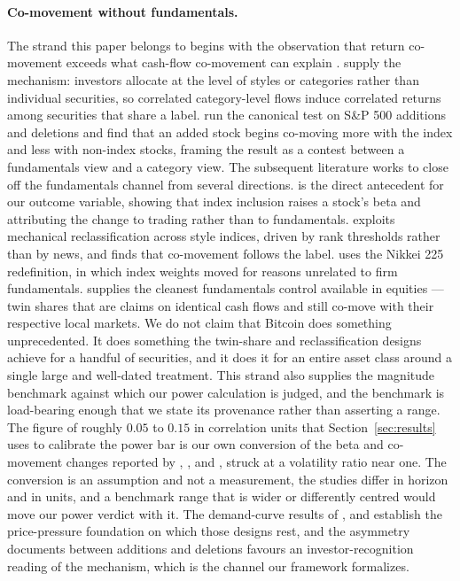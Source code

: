 \documentclass[12pt,a4paper]{article}
\begin{document}
\paragraph{Co-movement without fundamentals.} The strand this paper belongs to begins with the observation that return co-movement exceeds what cash-flow co-movement can explain \citep{pindyck1993the}. \citet{barberis2003style} supply the mechanism: investors allocate at the level of styles or categories rather than individual securities, so correlated category-level flows induce correlated returns among securities that share a label. \citet{barberis2004comovement} run the canonical test on S\&P 500 additions and deletions and find that an added stock begins co-moving more with the index and less with non-index stocks, framing the result as a contest between a fundamentals view and a category view. The subsequent literature works to close off the fundamentals channel from several directions. \citet{vijh1994sp} is the direct antecedent for our outcome variable, showing that index inclusion raises a stock's beta and attributing the change to trading rather than to fundamentals. \citet{boyer2011stylerelated} exploits mechanical reclassification across style indices, driven by rank thresholds rather than by news, and finds that co-movement follows the label. \citet{greenwood2007excess} uses the Nikkei 225 redefinition, in which index weights moved for reasons unrelated to firm fundamentals. \citet{froot1999how} supplies the cleanest fundamentals control available in equities — twin shares that are claims on identical cash flows and still co-move with their respective local markets. We do not claim that Bitcoin does something unprecedented. It does something the twin-share and reclassification designs achieve for a handful of securities, and it does it for an entire asset class around a single large and well-dated treatment. This strand also supplies the magnitude benchmark against which our power calculation is judged, and the benchmark is load-bearing enough that we state its provenance rather than asserting a range. The figure of roughly $0.05$ to $0.15$ in correlation units that Section~\ref{sec:results} uses to calibrate the power bar is our own conversion of the beta and co-movement changes reported by \citet{vijh1994sp}, \citet{barberis2004comovement}, \citet{boyer2011stylerelated} and \citet{greenwood2007excess}, struck at a volatility ratio near one. The conversion is an assumption and not a measurement, the studies differ in horizon and in units, and a benchmark range that is wider or differently centred would move our power verdict with it. The demand-curve results of \citet{shleifer1986do}, \citet{harris1986price} and \citet{chen2004the} establish the price-pressure foundation on which those designs rest, and the asymmetry \citet{chen2004the} documents between additions and deletions favours an investor-recognition reading of the mechanism, which is the channel our framework formalizes.
\end{document}
